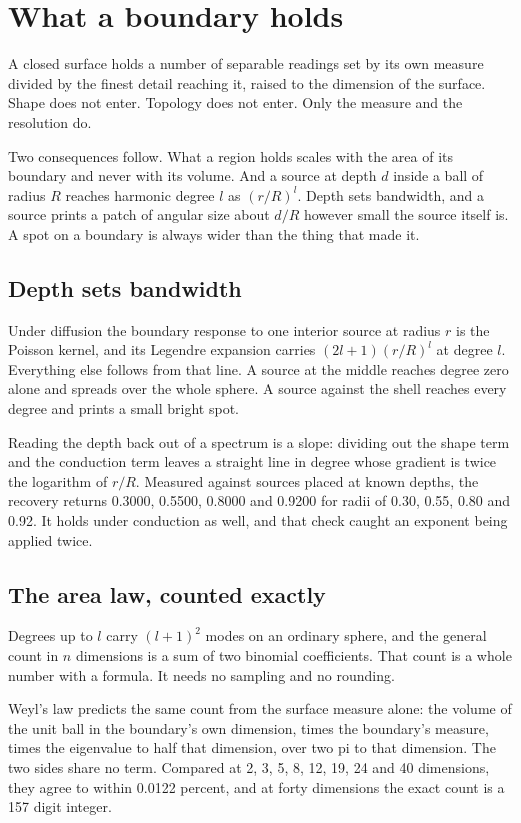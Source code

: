 \chapter{What a boundary holds}

A closed surface holds a number of separable readings set by its own measure divided by the finest detail reaching it, raised to the dimension of the surface. Shape does not enter. Topology does not enter. Only the measure and the resolution do.

Two consequences follow. What a region holds scales with the area of its boundary and never with its volume. And a source at depth $d$ inside a ball of radius $R$ reaches harmonic degree $l$ as $(r/R)^l$. Depth sets bandwidth, and a source prints a patch of angular size about $d/R$ however small the source itself is. A spot on a boundary is always wider than the thing that made it.

\section{Depth sets bandwidth}

Under diffusion the boundary response to one interior source at radius $r$ is the Poisson kernel, and its Legendre expansion carries $(2l+1)(r/R)^l$ at degree $l$. Everything else follows from that line. A source at the middle reaches degree zero alone and spreads over the whole sphere. A source against the shell reaches every degree and prints a small bright spot.

Reading the depth back out of a spectrum is a slope: dividing out the shape term and the conduction term leaves a straight line in degree whose gradient is twice the logarithm of $r/R$. Measured against sources placed at known depths, the recovery returns 0.3000, 0.5500, 0.8000 and 0.9200 for radii of 0.30, 0.55, 0.80 and 0.92. It holds under conduction as well, and that check caught an exponent being applied twice.

\section{The area law, counted exactly}

Degrees up to $l$ carry $(l+1)^2$ modes on an ordinary sphere, and the general count in $n$ dimensions is a sum of two binomial coefficients. That count is a whole number with a formula. It needs no sampling and no rounding.

Weyl's law predicts the same count from the surface measure alone: the volume of the unit ball in the boundary's own dimension, times the boundary's measure, times the eigenvalue to half that dimension, over two pi to that dimension. The two sides share no term. Compared at 2, 3, 5, 8, 12, 19, 24 and 40 dimensions, they agree to within 0.0122 percent, and at forty dimensions the exact count is a 157 digit integer.

